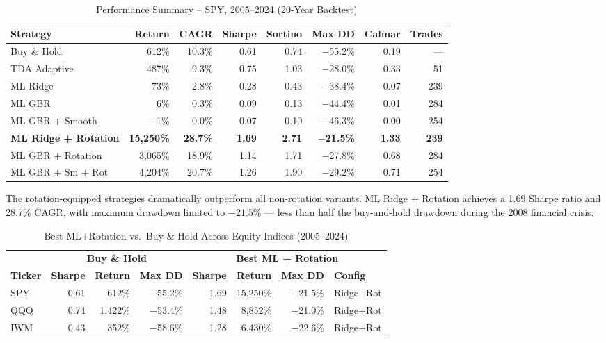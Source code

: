 \documentclass[11pt]{article}
\begin{document}
\begin{table}[ht]
\centering
\caption{Performance Summary -- SPY, 2005--2024 (20-Year Backtest)}
\small
\begin{tabular}{lrrrrrrr}
\toprule
\textbf{Strategy} & \textbf{Return} & \textbf{CAGR} & \textbf{Sharpe} & \textbf{Sortino} & \textbf{Max DD} & \textbf{Calmar} & \textbf{Trades} \\
\midrule
\rowcolor{benchbg} Buy \& Hold & 612\% & 10.3\% & 0.61 & 0.74 & $-$55.2\% & 0.19 & --- \\
TDA Adaptive & 487\% & 9.3\% & 0.75 & 1.03 & $-$28.0\% & 0.33 & 51 \\
ML Ridge & 73\% & 2.8\% & 0.28 & 0.43 & $-$38.4\% & 0.07 & 239 \\
ML GBR & 6\% & 0.3\% & 0.09 & 0.13 & $-$44.4\% & 0.01 & 284 \\
ML GBR + Smooth & $-$1\% & 0.0\% & 0.07 & 0.10 & $-$46.3\% & 0.00 & 254 \\
\midrule
\rowcolor{bestbg} \textbf{ML Ridge + Rotation} & \textbf{15{,}250\%} & \textbf{28.7\%} & \textbf{1.69} & \textbf{2.71} & $-$\textbf{21.5\%} & \textbf{1.33} & \textbf{239} \\
ML GBR + Rotation & 3{,}065\% & 18.9\% & 1.14 & 1.71 & $-$27.8\% & 0.68 & 284 \\
ML GBR + Sm + Rot & 4{,}204\% & 20.7\% & 1.26 & 1.90 & $-$29.2\% & 0.71 & 254 \\
\bottomrule
\end{tabular}
\end{table}

\noindent The rotation-equipped strategies dramatically outperform all non-rotation variants. ML Ridge + Rotation achieves a 1.69 Sharpe ratio and 28.7\% CAGR, with maximum drawdown limited to $-21.5\%$ --- less than half the buy-and-hold drawdown during the 2008 financial crisis.

\begin{table}[ht]
\centering
\caption{Best ML+Rotation vs.\ Buy \& Hold Across Equity Indices (2005--2024)}
\small
\begin{tabular}{l|rrr|rrrl}
\toprule
 & \multicolumn{3}{c|}{\cellcolor{benchbg}\textbf{Buy \& Hold}} & \multicolumn{4}{c}{\cellcolor{bestbg}\textbf{Best ML + Rotation}} \\
\textbf{Ticker} & \textbf{Sharpe} & \textbf{Return} & \textbf{Max DD} & \textbf{Sharpe} & \textbf{Return} & \textbf{Max DD} & \textbf{Config} \\
\midrule
SPY & 0.61 & 612\% & $-$55.2\% & 1.69 & 15{,}250\% & $-$21.5\% & Ridge+Rot \\
QQQ & 0.74 & 1{,}422\% & $-$53.4\% & 1.48 & 8{,}852\% & $-$21.0\% & Ridge+Rot \\
IWM & 0.43 & 352\% & $-$58.6\% & 1.28 & 6{,}430\% & $-$22.6\% & Ridge+Rot \\
\bottomrule
\end{tabular}
\end{table}
\end{document}
